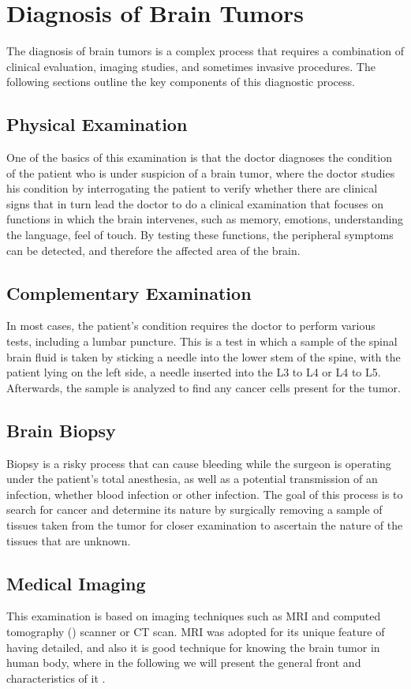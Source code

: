 \section{Diagnosis of Brain Tumors}
\label{sec:diagnosis-brain-tumors}
The diagnosis of brain tumors is a complex process that requires a combination of clinical evaluation, imaging studies, and sometimes invasive procedures. The following sections outline the key components of this diagnostic process.
\subsection{Physical Examination}
One of the basics of this examination is that the doctor diagnoses the condition of the patient who is under suspicion of a brain tumor, where the doctor studies his condition by interrogating the patient to verify whether there are clinical signs that in turn lead the doctor to do a clinical examination that focuses on functions in which the brain intervenes, such as memory, emotions, understanding the language, feel of touch. By testing these functions, the peripheral symptoms can be detected, and therefore the affected area of the brain.

\subsection{Complementary Examination}
In most cases, the patient's condition requires the doctor to perform various tests, including a lumbar puncture. This is a test in which a sample of the spinal brain fluid is taken by sticking a needle into the lower stem of the spine, with the patient lying on the left side, a needle inserted into the L3 to L4 or L4 to L5. Afterwards, the sample is analyzed to find any cancer cells present for the tumor.

\subsection{Brain Biopsy}
Biopsy is a risky process that can cause bleeding while the surgeon is operating under the patient's total anesthesia, as well as a potential transmission of an infection, whether blood infection or other infection. The goal of this process is to search for cancer and determine its nature by surgically removing a sample of tissues taken from the tumor for closer examination to ascertain the nature of the tissues that are unknown.

\subsection{Medical Imaging}
This examination is based on imaging techniques such as MRI and computed tomography () scanner or CT scan. MRI was adopted for its unique feature of having detailed, and also it is good technique for knowing the brain tumor in human body, where in the following we will present the general front and characteristics of it \cite{ref10}.


